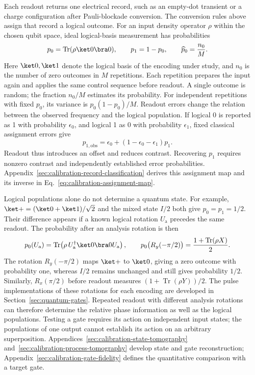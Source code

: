 Each readout returns one electrical record, such as an empty-dot
transient or a charge configuration after Pauli-blockade conversion.
The conversion rules above assign that record a logical outcome.
For an input density operator $\rho$ within the chosen qubit space,
ideal logical-basis measurement has probabilities
\begin{equation}
 p_0=\operatorname{Tr}(\rho\ket0\bra0),\qquad
 p_1=1-p_0,\qquad
 \widehat p_0=\frac{n_0}{M}.
 \label{eq:platform-repeated-readout}
\end{equation}
Here $\ket0,\ket1$ denote the logical basis of the encoding under
study, and $n_0$ is the number of zero outcomes in $M$ repetitions.
Each repetition prepares the input again and applies the same
control sequence before readout. A single outcome is random;
the fraction $n_0/M$ estimates its probability. For independent
repetitions with fixed $p_0$, its variance is $p_0(1-p_0)/M$.
Readout errors change the relation between the observed frequency
and the logical population. If logical 0 is reported as 1 with
probability $\epsilon_0$, and logical 1 as 0 with probability
$\epsilon_1$, fixed classical assignment errors give
\begin{equation}
 p_{1,\mathrm{obs}}
   =\epsilon_0+(1-\epsilon_0-\epsilon_1)p_1.
 \label{eq:platform-readout-assignment}
\end{equation}
Readout thus introduces an offset and reduces contrast. Recovering
$p_1$ requires nonzero contrast and independently established error
probabilities. Appendix~\ref{sec:calibration-record-classification}
derives this assignment map and its inverse in
Eq.~\eqref{eq:calibration-assignment-map}.

Logical populations alone do not determine a quantum state.
For example, $\ket+= (\ket0+\ket1)/\sqrt2$ and the mixed state
$I/2$ both give $p_0=p_1=1/2$. Their difference appears if a known
logical rotation $U_{\mathrm a}$ precedes the same readout.
The probability after an analysis rotation is then
\begin{equation}
 p_0(U_{\mathrm a})
   =\operatorname{Tr}\!\left(\rho\,
            U_{\mathrm a}^\dagger\ket0\bra0 U_{\mathrm a}\right),
 \qquad
 p_0\bigl(R_y(-\pi/2)\bigr)
   =\frac{1+\operatorname{Tr}(\rho X)}2.
 \label{eq:platform-analysis-probability}
\end{equation}
The rotation $R_y(-\pi/2)$ maps $\ket+$ to $\ket0$, giving a zero
outcome with probability one, whereas $I/2$ remains unchanged and
still gives probability $1/2$. Similarly, $R_x(\pi/2)$ before
readout measures $(1+\operatorname{Tr}(\rho Y))/2$.
The pulse implementations of these rotations for each encoding
are developed in Section~\ref{sec:quantum-gates}. Repeated readout with
different analysis rotations can therefore determine the relative
phase information as well as the logical populations.
Testing a gate requires its action on independent input states;
the populations of one output cannot establish its action on an
arbitrary superposition. Appendices~\ref{sec:calibration-state-tomography}
and~\ref{sec:calibration-process-tomography} develop state and gate
reconstruction; Appendix~\ref{sec:calibration-gate-fidelity}
defines the quantitative comparison with a target gate.

